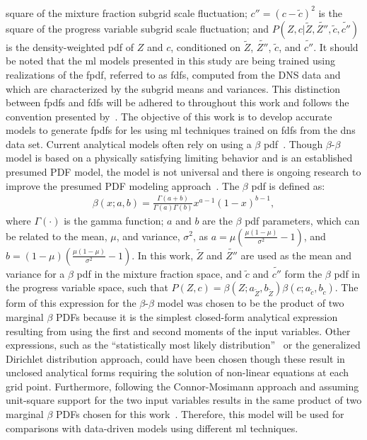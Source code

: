 \documentclass[review]{elsarticle}
\newcommand{\wt}[1]{\widetilde{#1}}
\begin{document}
square of the mixture fraction subgrid scale fluctuation;
$c'' = (c - \wt{c})^2$ is the square of the progress variable subgrid
scale fluctuation; and $P(Z,c | \wt{Z}, \wt{Z''}, \wt{c}, \wt{c''})$
is the density-weighted \gls{pdf} of $Z$ and $c$, conditioned on
$\wt{Z}$, $\wt{Z''}$, $\wt{c}$, and $\wt{c''}$. It should be noted
that the \gls{ml} models presented in this study are being trained
using realizations of the \gls{fpdf}, referred to as \glspl{fdf},
computed from the DNS data and which are characterized by the subgrid
means and variances. This distinction between \glspl{fpdf} and
\glspl{fdf} will be adhered to throughout this work and follows the
convention presented by~\citet{Fox2003, Pitsch2006a}. The objective of
this work is to develop accurate models to generate \glspl{fpdf} for
\gls{les} using \gls{ml} techniques trained on \glspl{fdf} from the
\gls{dns} data set. Current analytical models often rely on using a
$\beta$ \gls{pdf}~\cite{Cook1994}. Though $\beta$-$\beta$ model is
based on a physically satisfying limiting behavior and is an
established presumed PDF model, the model is not universal and there
is ongoing research to improve the presumed PDF modeling
approach~\cite{Grout2009,Isaac2014,Linse2014}. The $\beta$ \gls{pdf} is defined as:
\begin{align}
  \label{eq:beta}
  \beta(x; a, b) = \frac{\Gamma(a + b)}{\Gamma(a)\Gamma(b)} x^{a-1} (1-x)^{b-1},
\end{align}
where $\Gamma(\cdot)$ is the gamma function; $a$ and $b$ are the
$\beta$ \gls{pdf} parameters, which can be related to the mean, $\mu$,
and variance, $\sigma^2$, as
$a=\mu \left( \frac{\mu (1-\mu)}{\sigma^2} - 1\right)$, and
$b=(1-\mu) \left( \frac{\mu (1-\mu)}{\sigma^2} - 1\right)$. In this
work, $\wt{Z}$ and $\wt{Z''}$ are used as the mean and variance for a
$\beta$ \gls{pdf} in the mixture fraction space, and $\wt{c}$ and
$\wt{c''}$ form the $\beta$ \gls{pdf} in the progress variable space,
such that
$P(Z,c) = \beta(Z; a_{\wt{Z}}, b_{\wt{Z}}) \beta(c; a_{\wt{c}},
b_{\wt{c}})$. The form of this expression for the $\beta$-$\beta$
model was chosen to be the product of two marginal $\beta$ PDFs
because it is the simplest closed-form analytical expression resulting
from using the first and second moments of the input variables. Other
expressions, such as the ``statistically most likely
distribution''~\cite{Ihme2008} or the generalized Dirichlet
distribution approach, could have been chosen though these result in
unclosed analytical forms requiring the solution of non-linear
equations at each grid point. Furthermore, following the
Connor-Mosimann approach and assuming unit-square support for the two
input variables results in the same product of two marginal $\beta$
PDFs chosen for this work~\cite{Perry2018}. Therefore, this model will
be used for comparisons with data-driven models using different
\gls{ml} techniques.
\end{document}
